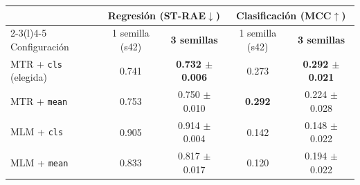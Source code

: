 \documentclass[11pt,a4paper]{article}
\newcommand{\var}[1]{\texttt{#1}}
\begin{document}
\begin{center}
\begin{tabular}{lcc@{\qquad}cc}
\toprule
& \multicolumn{2}{c}{Regresión (ST-RAE$\downarrow$)} & \multicolumn{2}{c}{Clasificación (MCC$\uparrow$)} \\
\cmidrule(r){2-3}\cmidrule(l){4-5}
Configuración & 1 semilla (s42) & \textbf{3 semillas} & 1 semilla (s42) & \textbf{3 semillas} \\ \midrule
MTR + \var{cls} (elegida) & 0.741 & \textbf{0.732 $\pm$ 0.006} & 0.273 & \textbf{0.292 $\pm$ 0.021} \\
MTR + \var{mean}          & 0.753 & 0.750 $\pm$ 0.010 & \textbf{0.292} & 0.224 $\pm$ 0.028 \\
MLM + \var{cls}           & 0.905 & 0.914 $\pm$ 0.004 & 0.142 & 0.148 $\pm$ 0.022 \\
MLM + \var{mean}          & 0.833 & 0.817 $\pm$ 0.017 & 0.120 & 0.194 $\pm$ 0.022 \\
\bottomrule
\end{tabular}
\end{center}
\end{document}
